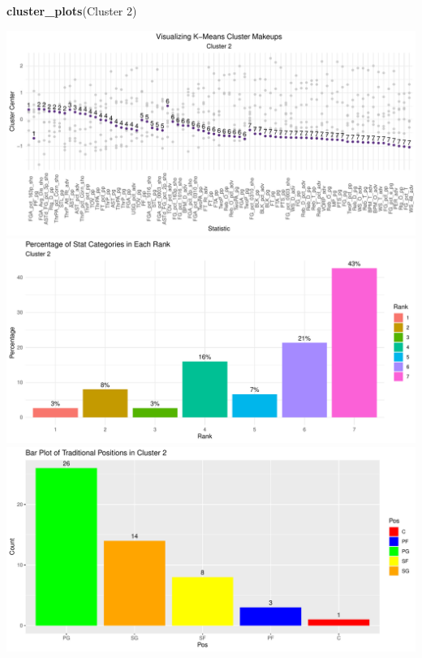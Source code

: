 \documentclass[
]{article}
\newenvironment{Shaded}{\begin{snugshade}}{\end{snugshade}}
\newcommand{\FunctionTok}[1]{\textcolor[rgb]{0.13,0.29,0.53}{\textbf{#1}}}
\newcommand{\NormalTok}[1]{#1}
\newcommand{\StringTok}[1]{\textcolor[rgb]{0.31,0.60,0.02}{#1}}
\begin{document}
\begin{Shaded}
\begin{Highlighting}[]
\FunctionTok{cluster\_plots}\NormalTok{(}\StringTok{\textquotesingle{}Cluster 2\textquotesingle{}}\NormalTok{)}
\end{Highlighting}
\end{Shaded}

\includegraphics{Reclassifying-NBA-Player-Postions-Pt.-3---Clustering-Analysis-Results_files/figure-latex/unnamed-chunk-3-1.pdf}
\includegraphics{Reclassifying-NBA-Player-Postions-Pt.-3---Clustering-Analysis-Results_files/figure-latex/unnamed-chunk-3-2.pdf}
\includegraphics{Reclassifying-NBA-Player-Postions-Pt.-3---Clustering-Analysis-Results_files/figure-latex/unnamed-chunk-3-3.pdf}
\end{document}

